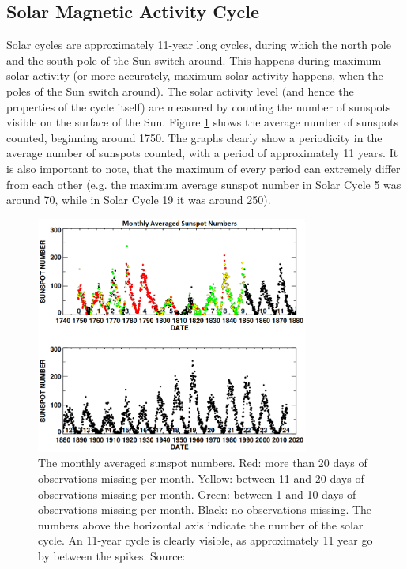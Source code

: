 \documentclass[12pt]{article}
\begin{document}
    \subsection{Solar Magnetic Activity Cycle}\label{sec:solarcycle}
        Solar cycles are approximately 11-year long cycles, during which the north pole and the south pole of the Sun switch around. This happens during maximum solar activity (or more accurately, maximum solar activity happens, when the poles of the Sun switch around). The solar activity level (and hence the properties of the cycle itself) are measured by counting the number of sunspots visible on the surface of the Sun. Figure \ref{fig:sunspots} shows the average number of sunspots counted, beginning around 1750. The graphs clearly show a periodicity in the average number of sunspots counted, with a period of approximately 11 years. It is also important to note, that the maximum of every period can extremely differ from each other (e.g. the maximum average sunspot number in Solar Cycle 5 was around 70, while in Solar Cycle 19 it was around 250).\\
        \begin{figure}[t!]
            \centering
            \includegraphics[width=0.8\textwidth]{fig_theory/sunspots.png}
            \caption{The monthly averaged sunspot numbers. Red: more than 20 days of observations missing per month. Yellow: between 11 and 20 days of observations missing per month. Green: between 1 and 10 days of observations missing per month. Black: no observations missing. The numbers above the horizontal axis indicate the number of the solar cycle. An 11-year cycle is clearly visible, as approximately 11 year go by between the spikes. Source: \cite{2015hathaway}}
            \label{fig:sunspots}
        \end{figure}\\
\end{document}
